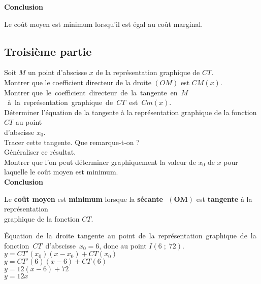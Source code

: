 \textbf{Conclusion} 

Le coût moyen est minimum lorsqu'il est égal au coût marginal. 

\newpage

\subsection{Troisième partie}

Soit $M$ un point d'abscisse $x$ de la représentation graphique de $CT$. \\

Montrer que le coefficient directeur de la droite $\left(OM\right)$ est $CM(x)$. \\

Montrer \hbox{que le coefficient directeur de la tangente en $M$ à la représentation graphique de $CT$ est $Cm(x)$.} \\

Déterminer l'équation de la tangente à la représentation graphique de la fonction $CT$ au point \\ d'abscisse $x_0$. \\

Tracer cette tangente. Que remarque-t-on ? \\

Généraliser ce résultat. \\

Montrer que l'on peut déterminer graphiquement la valeur de $x_0$ de $x$ pour laquelle le coût moyen est minimum. \\

\textbf{Conclusion}

Le \textbf{coût moyen} est \textbf{minimum} lorsque la \textbf{sécante $ \; \mathbf{\left(OM\right)}$} est \textbf{tangente} à la représentation \\ graphique de la fonction $CT$.

\vspace*{.6cm}

\hbox{Équation de la droite tangente au point de la représentation graphique de la fonction $CT$ d'abscisse $x_0 = 6$,} donc au point $I(6 \; ; \; 72)$. \\

$y = CT'(x_0)(x-x_0)+CT(x_0)$ \\
$y = CT'(6)(x-6)+CT(6)$ \\
$y = 12\left(x-6\right)+72$ \\
$ y = 12x$ \\

